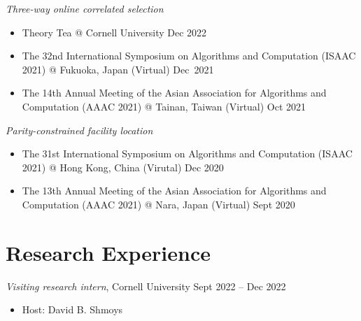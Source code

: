 \documentclass{article}
\newcommand{\killinitspace}{-0.7em}
\begin{document}
\textsl{Three-way online correlated selection}
\vspace{\killinitspace}
\begin{itemize}
\item Theory Tea @ Cornell University \hfill Dec 2022
\item The 32nd International Symposium on Algorithms and Computation (ISAAC 2021) @  Fukuoka, Japan (Virtual) \hfill Dec~2021
\item The 14th Annual Meeting of the Asian Association for Algorithms and Computation (AAAC 2021) @ Tainan, Taiwan (Virtual) \hfill Oct 2021
\end{itemize}

\textsl{Parity-constrained facility location}
\vspace{\killinitspace}
\begin{itemize}
\item The 31st International Symposium on Algorithms and Computation (ISAAC 2021) @ Hong Kong, China (Virutal) \hfill Dec 2020
\item The 13th Annual Meeting of the Asian Association for Algorithms and Computation (AAAC 2021) @ Nara, Japan (Virtual) \hfill Sept 2020
\end{itemize}

\newpage
\section{Research Experience}
\textsl{Visiting research intern}, Cornell University \hfill Sept 2022 -- Dec 2022
\vspace{\killinitspace}
\begin{itemize}
\item Host: David B. Shmoys
\end{itemize}
\end{document}
